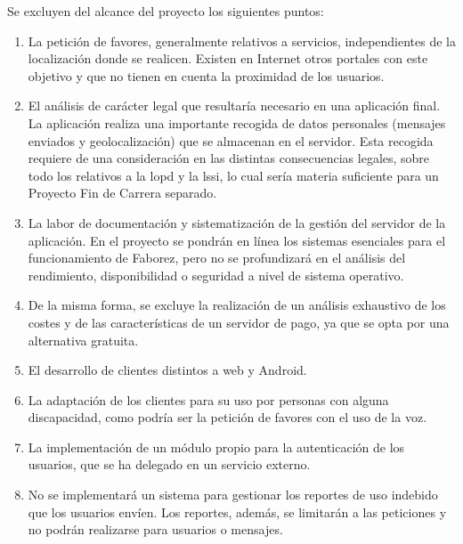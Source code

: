 \documentclass[main]{subfiles}
\begin{document}
Se excluyen del alcance del proyecto los siguientes puntos:

\begin{enumerate}

  \item La petición de favores, generalmente relativos a servicios, independientes de la localización donde se realicen. Existen en Internet otros portales con este objetivo y que no tienen en cuenta la proximidad de los usuarios.

  \item El análisis de carácter legal que resultaría necesario en una aplicación final. La aplicación realiza una importante recogida de datos personales (mensajes enviados y geolocalización) que se almacenan en el servidor. Esta recogida requiere de una consideración en las distintas consecuencias legales, sobre todo los relativos a la \gls{lopd} y la \gls{lssi}, lo cual sería materia suficiente para un Proyecto Fin de Carrera separado.
  
  \item La labor de documentación y sistematización de la gestión del servidor de la aplicación. En el proyecto se pondrán en línea los sistemas esenciales para el funcionamiento de Faborez, pero no se profundizará en el análisis del rendimiento, disponibilidad o seguridad a nivel de sistema operativo.
  
  \item De la misma forma, se excluye la realización de un análisis exhaustivo de los costes y de las características de un servidor de pago, ya que se opta por una alternativa gratuita.
  
  \item El desarrollo de clientes distintos a web y Android.
  
  \item La adaptación de los clientes para su uso por personas con alguna discapacidad, como podría ser la petición de favores con el uso de la voz.
  
  \item La implementación de un módulo propio para la autenticación de los usuarios, que se ha delegado en un servicio externo.
  
  \item No se implementará un sistema para gestionar los reportes de uso indebido que los usuarios envíen. Los reportes, además, se limitarán a las peticiones y no podrán realizarse para usuarios o mensajes.

\end{enumerate}
\end{document}
